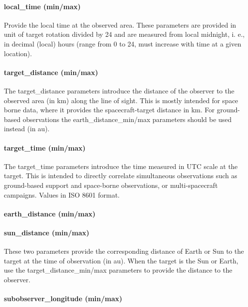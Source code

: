 \documentclass[11pt,a4paper]{ivoa}
\begin{document}
\paragraph{local\_time (min/max)}

Provide the local time at the observed area. These parameters are provided in unit of target rotation divided by 24 and are measured from local midnight, i. e., in decimal (local) hours (range from 0 to 24, must increase with time at a given location). 

\paragraph{target\_distance (min/max)}

The target\_distance parameters introduce the distance of the observer to the observed area (in km) along the line of sight. This is mostly intended for space borne data, where it provides the spacecraft-target distance in km. For ground-based observations the earth\_distance\_min/max parameters should be used instead (in au).

\paragraph{target\_time (min/max)}

The target\_time parameters introduce the time measured in UTC scale at the target. This is intended to directly correlate simultaneous observations such as ground-based support and space-borne observations, or multi-spacecraft campaigns. Values in ISO 8601 format. 

\paragraph{earth\_distance (min/max)}

\paragraph{sun\_distance (min/max)}

These two parameters provide the corresponding distance of Earth or Sun to the target at the time of observation (in au). When the target is the Sun or Earth, use the target\_distance\_min/max parameters to provide the distance to the observer.

\paragraph{subobserver\_longitude (min/max)}
\end{document}
